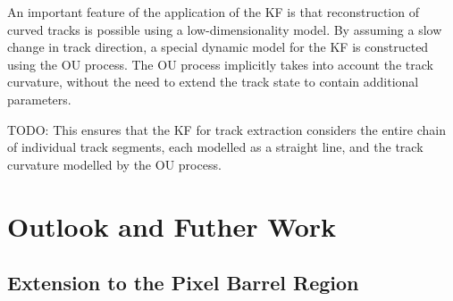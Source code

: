 An important feature of the application of the KF is that reconstruction of curved tracks is possible using a low-dimensionality model. By assuming a slow change in track direction, a special dynamic model for the KF is constructed using the OU process. The OU process implicitly takes into account the track curvature, without the need to extend the track state to contain additional parameters.


TODO: 
This ensures that the KF for track extraction considers the entire chain of individual track segments, each modelled as a straight line, and the track curvature modelled by the OU process.







\section{Outlook and Futher Work}
\label{chapter-7-outlook}

\subsection{Extension to the Pixel Barrel Region}



